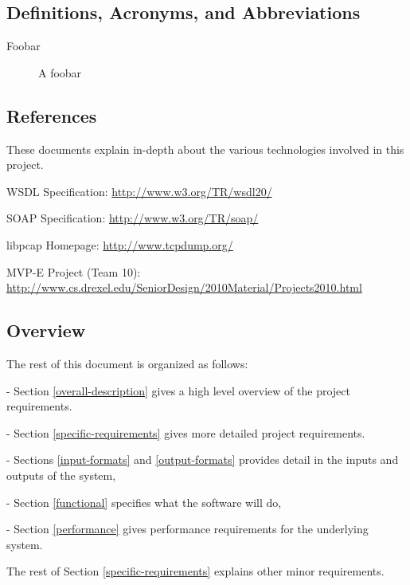 \documentclass[titlepage]{article}
\begin{document}

\subsection{Definitions, Acronyms, and Abbreviations%
  \label{definitions}%
}

\begin{description}
\item[Foobar]
    A foobar
\end{description}


\subsection{References%
  \label{references}%
}

These documents explain in-depth about the various technologies involved in
this project.
%
\begin{itemize*}
\item WSDL Specification: \url{http://www.w3.org/TR/wsdl20/}
\item SOAP Specification: \url{http://www.w3.org/TR/soap/}
\item libpcap Homepage: \url{http://www.tcpdump.org/}
\item MVP-E Project (Team 10): \url{http://www.cs.drexel.edu/SeniorDesign/2010Material/Projects2010.html}
\end{itemize*}


\subsection{Overview%
  \label{overview}%
}

The rest of this document is organized as follows: 
\begin{itemize*}
\item[-]Section
\ref{overall-description} gives a high level overview of the project
requirements.  
\item[-]Section \ref{specific-requirements} gives more detailed project
requirements.  
\item[-]Sections \ref{input-formats} and \ref{output-formats} provides
detail in the inputs and outputs of the system, 
\item[-]Section \ref{functional}
specifies what the software will do, 
\item[-]Section \ref{performance} gives
performance requirements for the underlying system.
\end{itemize*}
The rest of Section
\ref{specific-requirements} explains other minor requirements.
\end{document}
